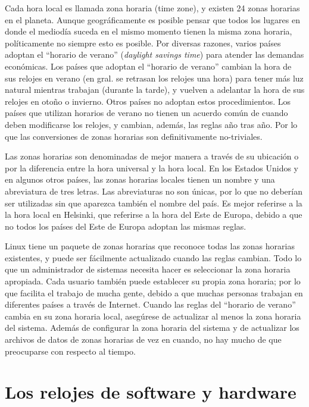 \documentclass[12pt]{article}
\begin{document}
Cada hora local es llamada zona horaria (time zone), y existen 24 zonas horarias
en el planeta. Aunque geográficamente es posible pensar que todos los lugares
en donde el mediodía suceda en el mismo momento tienen la misma zona horaria,
políticamente no siempre esto es posible. Por diversas razones, varios países
adoptan el ``horario de verano'' (\textit{daylight savings time}) para atender las demandas
económicas. Los países que adoptan el ``horario de verano'' cambian la hora
de sus relojes en verano (en gral. se retrasan los relojes una hora) para
tener más luz natural mientras trabajan (durante la tarde), y vuelven a adelantar
la hora de sus relojes en otoño o invierno. Otros países no adoptan estos procedimientos.
Los países que utilizan horarios de verano no tienen un acuerdo común de cuando deben
modificarse los relojes, y cambian, además, las reglas año tras año. Por lo que las
conversiones de zonas horarias son definitivamente no-triviales.



Las zonas horarias son denominadas de mejor manera a través de su ubicación o por
la diferencia entre la hora universal y la hora local. En los Estados Unidos y
en algunos otros países, las zonas horarias locales tienen un nombre y una abreviatura
de tres letras. Las abreviaturas no son únicas, por lo que no deberían
ser utilizadas sin que aparezca también el nombre del país. Es mejor referirse a la
la hora local en Helsinki, que referirse a la hora del Este de Europa, debido a que
no todos los países del Este de Europa adoptan las mismas reglas.



Linux tiene un paquete de zonas horarias que reconoce todas las zonas horarias existentes,
y puede ser fácilmente actualizado cuando las reglas cambian. Todo lo que un administrador de 
sistemas necesita hacer es seleccionar la zona horaria apropiada. Cada usuario también
puede establecer su propia zona horaria; por lo que facilita el trabajo de mucha gente,
debido a que muchas personas trabajan en diferentes países a través de Internet.
Cuando las reglas del ``horario de verano'' cambia en su zona horaria local, asegúrese
de actualizar al menos la zona horaria del sistema. Además de configurar la zona horaria
del sistema y de actualizar los archivos de datos de zonas horarias de vez en cuando, 
no hay mucho de que preocuparse con respecto al tiempo.




\section{ Los relojes de software y hardware}
\end{document}
